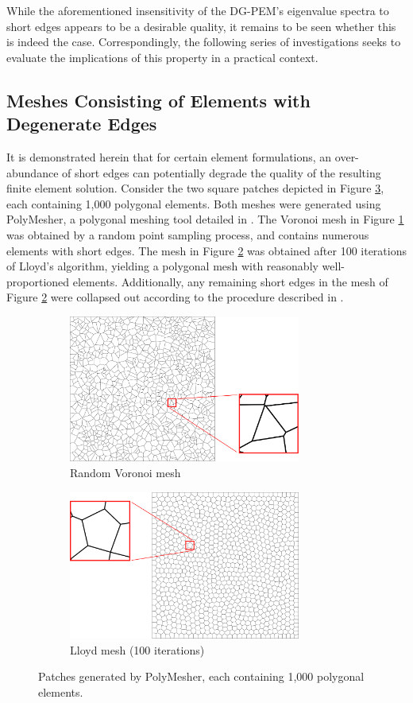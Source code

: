 While the aforementioned insensitivity of the DG-PEM's eigenvalue spectra to short edges appears to be a desirable quality, it remains to be seen whether this is indeed the case. Correspondingly, the following series of investigations seeks to evaluate the implications of this property in a practical context.

\subsection*{Meshes Consisting of Elements with Degenerate Edges}

It is demonstrated herein that for certain element formulations, an over-abundance of short edges can potentially degrade the quality of the resulting finite element solution. Consider the two square patches depicted in Figure \ref{fig:polygonal_patches}, each containing 1,000 polygonal elements. Both meshes were generated using PolyMesher, a polygonal meshing tool detailed in \cite{Talischi:12}. The Voronoi mesh in Figure \ref{fig:patch_mesh} was obtained by a random point sampling process, and contains numerous elements with short edges. The mesh in Figure \ref{fig:lloyd_mesh} was obtained after 100 iterations of Lloyd's algorithm, yielding a polygonal mesh with reasonably well-proportioned elements. Additionally, any remaining short edges in the mesh of Figure \ref{fig:lloyd_mesh} were collapsed out according to the procedure described in \cite{Talischi:12}.
\begin{figure}[!h]
    \centering
    \begin{subfigure}[b]{0.49\linewidth}
            \centering
            \includegraphics[width=3.0in]{figures/patch_mesh.pdf}
    			\caption{Random Voronoi mesh \label{fig:patch_mesh}}
    \end{subfigure}
	\begin{subfigure}[b]{0.49\linewidth}
            \centering
            \includegraphics[width=3.0in]{figures/lloyd_mesh.pdf}
    			\caption{Lloyd mesh (100 iterations) \label{fig:lloyd_mesh}}
    \end{subfigure}
    \caption{Patches generated by PolyMesher, each containing 1,000 polygonal elements.}
    \label{fig:polygonal_patches}
\end{figure}

